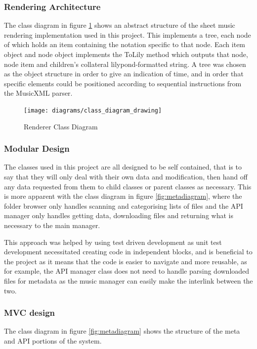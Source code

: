 \subsubsection{Rendering Architecture}
The class diagram in figure \ref{fig:classdiagram} shows an abstract structure of the sheet music rendering implementation used in this project. This implements a tree, each node of which holds an item containing the notation specific to that node. Each item object and node object implements the ToLily method which outputs that node, node item and children's collateral lilypond-formatted string. A tree was chosen as the object structure in order to give an indication of time, and in order that specific elements could be positioned according to sequential instructions from the MusicXML parser. 
\begin{figure}[H]
    \centering
    \texttt{[image: diagrams/class\_diagram\_drawing]}
    \caption{Renderer Class Diagram}
    \label{fig:classdiagram}
\end{figure}
\subsubsection{Modular Design}
The classes used in this project are all designed to be self contained, that is to say that they will only deal with their own data and modification, then hand off any data requested from them to child classes or parent classes as necessary. This is more apparent with the class diagram in figure \ref{fig:metadiagram}, where the folder browser only handles scanning and categorising lists of files and the API manager only handles getting data, downloading files and returning what is necessary to the main manager.

This approach was helped by using test driven development as unit test development necessitated creating code in independent blocks, and is beneficial to the project as it means that the code is easier to navigate and more reusable, as for example, the API manager class does not need to handle parsing downloaded files for metadata as the music manager can easily make the interlink between the two.

\subsubsection{MVC design}
The class diagram in figure \ref{fig:metadiagram} shows the structure of the meta and API portions of the system. 

